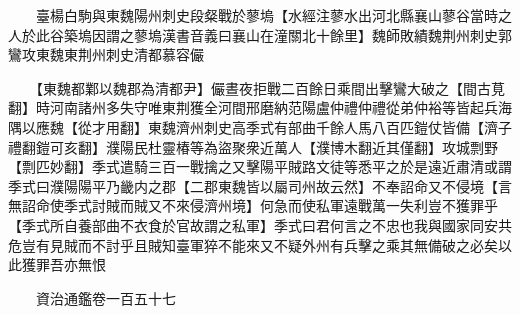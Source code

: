 　　臺楊白駒與東魏陽州刺史段粲戰於蓼塢【水經注蓼水出河北縣襄山蓼谷當時之人於此谷築塢因謂之蓼塢漢書音義曰襄山在潼關北十餘里】魏師敗績魏荆州刺史郭鸞攻東魏東荆州刺史清都慕容儼

　　【東魏都鄴以魏郡為清都尹】儼晝夜拒戰二百餘日乘間出擊鸞大破之【間古莧翻】時河南諸州多失守唯東荆獲全河間邢磨納范陽盧仲禮仲禮從弟仲裕等皆起兵海隅以應魏【從才用翻】東魏濟州刺史高季式有部曲千餘人馬八百匹鎧仗皆備【濟子禮翻鎧可亥翻】濮陽民杜靈椿等為盜聚衆近萬人【濮博木翻近其僅翻】攻城剽野【剽匹妙翻】季式遣騎三百一戰擒之又擊陽平賊路文徒等悉平之於是遠近肅清或謂季式曰濮陽陽平乃畿内之郡【二郡東魏皆以屬司州故云然】不奉詔命又不侵境【言無詔命使季式討賊而賊又不來侵濟州境】何急而使私軍遠戰萬一失利豈不獲罪乎【季式所自養部曲不衣食於官故謂之私軍】季式曰君何言之不忠也我與國家同安共危豈有見賊而不討乎且賊知臺軍猝不能來又不疑外州有兵擊之乘其無備破之必矣以此獲罪吾亦無恨

　　資治通鑑卷一百五十七


    


 


 



 

 
  







 


　　
　　
　
　
　


　　

　















	
	









































